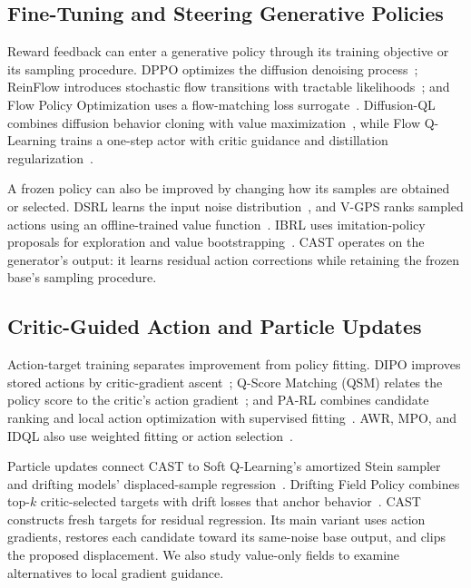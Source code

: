\subsection{Fine-Tuning and Steering Generative Policies}

Reward feedback can enter a generative policy through its training objective
or its sampling procedure. DPPO optimizes the diffusion denoising
process~\cite{ren2024dppo}; ReinFlow introduces stochastic flow transitions
with tractable likelihoods~\cite{reinflow2025}; and Flow Policy Optimization
uses a flow-matching loss surrogate~\cite{mcallister2025flowmatchingpolicygradients}.
Diffusion-QL combines diffusion behavior cloning with value
maximization~\cite{wang2023diffusionql}, while Flow Q-Learning trains a
one-step actor with critic guidance and distillation
regularization~\cite{park2025fql}.

A frozen policy can also be improved by changing how its samples are
obtained or selected. DSRL learns the input noise
distribution~\cite{wagenmaker2025dsrl}, and V-GPS ranks sampled actions
using an offline-trained value function~\cite{nakamoto2025vgps}. IBRL
uses imitation-policy proposals for exploration and value
bootstrapping~\cite{hu2024ibrl}. CAST operates on the generator's output:
it learns residual action corrections while retaining the frozen base's
sampling procedure.

\subsection{Critic-Guided Action and Particle Updates}

Action-target training separates improvement from policy fitting. DIPO
improves stored actions by critic-gradient ascent~\cite{dipo2024}; Q-Score
Matching (QSM) relates the policy score to the critic's action
gradient~\cite{psenka2024qsm}; and PA-RL combines candidate ranking and
local action optimization with supervised fitting~\cite{mark2024parl}.
AWR, MPO, and IDQL also use weighted fitting or action
selection~\cite{peng2019awr,abdolmaleki2018mpo,hansenestruch2023idql}.

Particle updates connect CAST to Soft Q-Learning's amortized Stein
sampler~\cite{haarnoja2017sql} and drifting models' displaced-sample
regression~\cite{deng2026drifting}. Drifting Field Policy combines top-$k$
critic-selected targets with drift losses that anchor behavior~\cite{dfp2026}.
CAST constructs fresh targets for residual regression. Its main variant
uses action gradients, restores each candidate toward its same-noise base
output, and clips the proposed displacement. We also study value-only
fields to examine alternatives to local gradient guidance.


